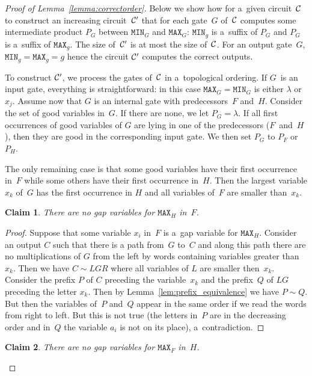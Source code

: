 \documentclass[11pt,letterpaper]{article}
\newtheorem{claim}{Claim}
\newcommand{\mmin}{\texttt{MIN}}
\newcommand{\mmax}{\texttt{MAX}}
\begin{document}
\begin{proof}[Proof of Lemma~\ref{lemma:correctorder}]
Below we show how for a~given circuit~${\cal C}$ to construct an increasing circuit~${\cal C}'$ that for each gate~$G$ of~${\cal C}$ computes some intermediate product $P_G$ between $\mmin_G$ and $\mmax_G$: $\mmin_g$ is a~suffix of $P_G$ and $P_G$ is a~suffix of $\mmax_g$. The size of~${\cal C}'$ is at most the size of~${\cal C}$. For an output gate~$G$, $\mmin_g=\mmax_g=g$ hence the circuit ${\cal C}'$ computes the correct outputs.

To construct ${\cal C}'$, we process the gates of~${\cal C}$ in a~topological ordering. If $G$~is an input gate, everything is straightforward: in this case $\mmax_G=\mmin_G$ is either $\lambda$ or $x_j$. Assume now that $G$ is an internal gate with predecessors~$F$ and~$H$.
Consider the set of good variables in~$G$. If there are none, we let $P_G=\lambda$. If all first occurrences of good variables of $G$ are lying in one of the predecessors ($F$~and~$H$), then they are good in the corresponding input gate. We then set $P_G$ to $P_F$ or $P_H$.

The only remaining case is that some good variables have their first occurrence in~$F$ while some others have their first occurrence in~$H$. Then the largest variable $x_k$ of~$G$ has the first occurrence in $H$ and all variables of~$F$ are smaller than~$x_k$.

\begin{claim} \label{cl: h is good}
There are no gap variables for $\mmax_H$ in~$F$.
\end{claim}

\begin{proof}
Suppose that some variable $x_i$ in~$F$ is a~gap variable for $\mmax_H$. Consider an output $C$ such that there is a path from~$G$ to~$C$ and along this path there are no multiplications of $G$ from the left by words containing variables greater than~$x_k$. Then we have $C \sim LGR$ where all variables of $L$ are smaller then~$x_k$. Consider the prefix $P$ of $C$ preceding the variable~$x_k$ and the prefix~$Q$ of $LG$ preceding the letter $x_k$.
Then by Lemma~\ref{lem:prefix_equivalence} we have $P \sim Q$. But then the variables of~$P$ and~$Q$ appear in the same order if we read the words from right to left. But this is not true (the letters in~$P$ are in the decreasing order and in~$Q$ the variable $a_i$ is not on its place), a~contradiction.
\end{proof}

\begin{claim}\label{cl: f is good}
There are no gap variables for $\mmax_F$ in~$H$.
\end{claim}


\end{proof}
\end{document}

